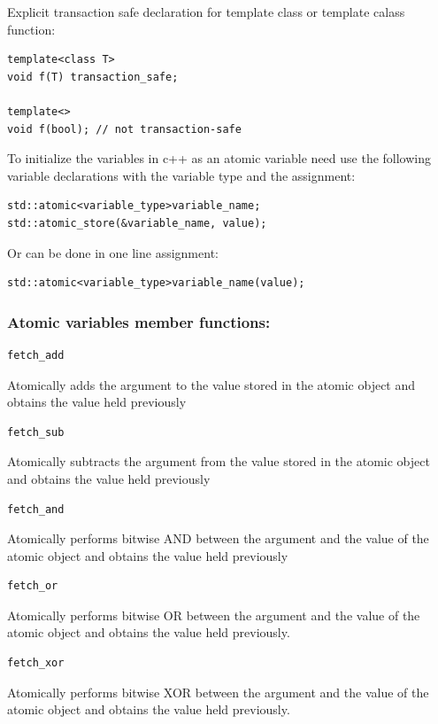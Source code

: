 \documentclass[12pt]{article}
\begin{document}
{\setlength{\parindent}{0cm}
Explicit transaction safe declaration for template class or template calass function:\\\cite{ISO/IEC}
}
\begin{lstlisting}
template<class T>
void f(T) transaction_safe;

template<>
void f(bool); // not transaction-safe
\end{lstlisting}

{\setlength{\parindent}{0cm}
To initialize the variables in c++ as an atomic variable need use the following variable declarations with the variable type and the assignment:
}
\begin{lstlisting}
std::atomic<variable_type>variable_name;
std::atomic_store(&variable_name, value);
\end{lstlisting}
Or can be done in one line assignment:
\begin{lstlisting}
std::atomic<variable_type>variable_name(value);
\end{lstlisting}

{\setlength{\parindent}{0cm}
\subsubsection{ Atomic variables member functions:}
}
\begin{lstlisting}
fetch_add
\end{lstlisting}
Atomically adds the argument to the value stored in the atomic object and obtains the value held previously 
\begin{lstlisting}
fetch_sub 
\end{lstlisting}
Atomically subtracts the argument from the value stored in the atomic object and obtains the value held previously 
\begin{lstlisting}
fetch_and
\end{lstlisting}
Atomically performs bitwise AND between the argument and the value of the atomic object and obtains the value held previously 
\begin{lstlisting}
fetch_or
\end{lstlisting}
Atomically performs bitwise OR between the argument and the value of the atomic object and obtains the value held previously.
\begin{lstlisting}
fetch_xor
\end{lstlisting}
Atomically performs bitwise XOR between the argument and the value of the atomic object and obtains the value held previously.\\
\end{document}
